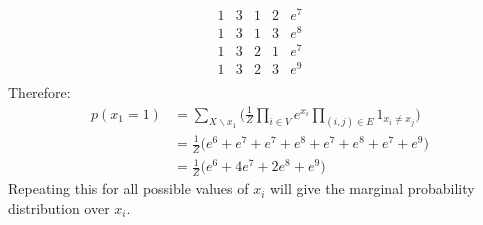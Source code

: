 \documentclass{article}
\begin{document}
\begin{enumerate}
\[\begin{array}{c|c|c|c|c}
            1 & 3 & 1 & 2 & e^7 \\
            1 & 3 & 1 & 3 & e^8 \\
            1 & 3 & 2 & 1 & e^7 \\
            1 & 3 & 2 & 3 & e^9 \\
        \end{array}
    \]
    Therefore:
    \begin{equation}
        \begin{aligned}
            p(x_1=1) &= \sum_{X \backslash x_1} \Bigg( \frac{1}{Z} \prod_{i \in V} e^{x_i} \prod_{(i,j) \in E} 1_{x_i \neq x_j} \Bigg) \\
            &= \frac{1}{Z} \Big( e^6 + e^7 + e^7 + e^8 + e^7 + e^8 + e^7 + e^9 \Big) \\
            &= \frac{1}{Z} \Big( e^6 + 4e^7 + 2e^8 + e^9 \Big)
        \end{aligned}
    \end{equation}
    Repeating this for all possible values of \(x_i\) will give the marginal
    probability distribution over \(x_i\).
\end{enumerate}
\end{document}
